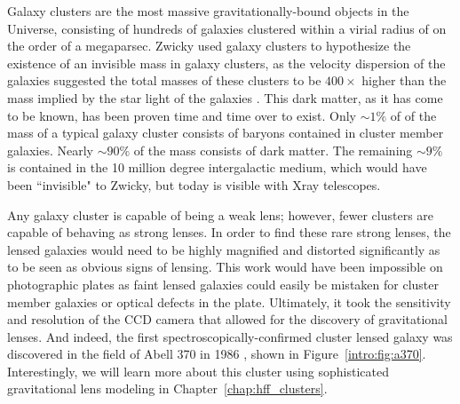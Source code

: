 Galaxy clusters are the most massive gravitationally-bound objects in the Universe, consisting of hundreds of galaxies clustered within a virial radius of on the order of a megaparsec. Zwicky used galaxy clusters to hypothesize the existence of an invisible mass in galaxy clusters, as the velocity dispersion of the galaxies suggested the total masses of these clusters to be $400\times$ higher than the mass implied by the star light of the galaxies \citep{Zwicky:1937yq}. This dark matter, as it has come to be known, has been proven time and time over to exist. Only $\sim1\%$ of of the mass of a typical galaxy cluster consists of baryons contained in cluster member galaxies. Nearly $\sim90\%$ of the mass consists of dark matter. The remaining $\sim9\%$ is contained in the 10 million degree intergalactic medium, which would have been ``invisible" to Zwicky, but today is visible with Xray telescopes.

Any galaxy cluster is capable of being a weak lens; however, fewer clusters are capable of behaving as strong lenses.  In order to find these rare strong lenses, the lensed galaxies would need to be highly magnified and distorted significantly as to be seen as obvious signs of lensing. This work would have been impossible on photographic plates as faint lensed galaxies could easily be mistaken for cluster member galaxies or optical defects in the plate. Ultimately, it took the sensitivity and resolution of the CCD camera that allowed for the discovery of gravitational lenses. And indeed, the first spectroscopically-confirmed cluster lensed galaxy was discovered in the field of Abell 370 in 1986 \citep{Soucail:1988kx,Soucail:1987sf,Soucail:1987rz}, shown in Figure~\ref{intro:fig:a370}. Interestingly, we will learn more about this cluster using sophisticated gravitational lens modeling in Chapter~\ref{chap:hff_clusters}.

